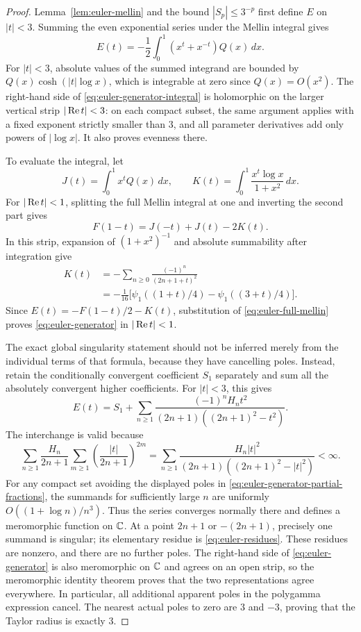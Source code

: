 \begin{proof}
Lemma~\ref{lem:euler-mellin} and the bound \(|S_p|\le3^{-p}\)
first define \(E\) on \(|t|<3\). Summing the even exponential
series under the Mellin integral gives
\begin{equation}
E(t)=-\frac12\int_0^1(x^t+x^{-t})Q(x)\,dx.
\label{eq:euler-generator-integral}
\end{equation}
For \(|t|<3\), absolute values of the summed integrand are bounded
by \(Q(x)\cosh(|t|\log x)\), which is integrable at zero since
\(Q(x)=O(x^2)\). The right-hand side of
\eqref{eq:euler-generator-integral} is holomorphic on the larger
vertical strip \(|\operatorname{Re} t|<3\): on each compact subset, the same
argument applies with a fixed exponent strictly smaller than \(3\),
and all parameter derivatives add only powers of \(|\log x|\).
It also proves evenness there.

To evaluate the integral, let
\[
J(t)=\int_0^1x^tQ(x)\,dx,
\qquad
K(t)=\int_0^1\frac{x^t\log x}{1+x^2}\,dx.
\]
For \(|\operatorname{Re} t|<1\), splitting the full Mellin integral at one
and inverting the second part gives
\[
F(1-t)=J(-t)+J(t)-2K(t).
\]
In this strip, expansion of \((1+x^2)^{-1}\) and absolute
summability after integration give
\begin{align*}
K(t)
&=-\sum_{n\ge0}\frac{(-1)^n}{(2n+1+t)^2}\\
&=-\frac1{16}
 \bigl[\psi_1((1+t)/4)-\psi_1((3+t)/4)\bigr].
\end{align*}
Since \(E(t)=-F(1-t)/2-K(t)\), substitution of
\eqref{eq:euler-full-mellin} proves
\eqref{eq:euler-generator} in \(|\operatorname{Re} t|<1\).

The exact global singularity statement should not be inferred merely
from the individual terms of that formula, because they have cancelling
poles. Instead, retain the conditionally convergent coefficient
\(S_1\) separately and sum all the absolutely convergent higher
coefficients. For \(|t|<3\), this gives
\begin{equation}
E(t)=S_1+\sum_{n\ge1}
 \frac{(-1)^nH_n t^2}
 {(2n+1)((2n+1)^2-t^2)}.
\label{eq:euler-generator-partial-fractions}
\end{equation}
The interchange is valid because
\[
\sum_{n\ge1}\frac{H_n}{2n+1}
 \sum_{m\ge1}\left(\frac{|t|}{2n+1}\right)^{2m}
=\sum_{n\ge1}
 \frac{H_n|t|^2}{(2n+1)((2n+1)^2-|t|^2)}<\infty.
\]
For any compact set avoiding the displayed poles in
\eqref{eq:euler-generator-partial-fractions}, the summands for
sufficiently large \(n\) are uniformly
\(O((1+\log n)/n^3)\). Thus the series converges normally there
and defines a meromorphic function on \(\mathbb{C}\). At a point
\(2n+1\) or \(-(2n+1)\), precisely one summand is singular;
its elementary residue is \eqref{eq:euler-residues}. These
residues are nonzero, and there are no further poles. The right-hand
side of \eqref{eq:euler-generator} is also meromorphic on \(\mathbb{C}\)
and agrees on an open strip, so the meromorphic identity theorem
proves that the two representations agree everywhere. In particular,
all additional apparent poles in the polygamma expression cancel.
The nearest actual poles to zero are \(3\) and \(-3\), proving
that the Taylor radius is exactly \(3\).


\end{proof}
